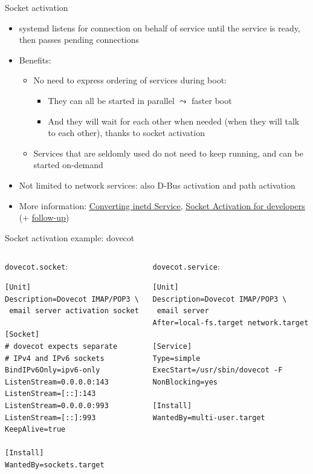 \documentclass[11pt,final,usepdftitle=false]{beamer}
\begin{document}
\begin{frame}{Socket activation}
\begin{itemize}
\item systemd listens for connection on behalf of service until the service is ready, then passes pending connections
\hbr
\item Benefits:
	\begin{itemize}
		\item \alert{No need to express ordering of services during boot}:
			\begin{itemize}
				\item They can all be started in parallel $\leadsto$ \alert{faster boot}
				\item And they will wait for each other when needed (when they will talk to each other), thanks to socket activation
			\end{itemize}
			\hbr
		\item Services that are \alert{seldomly used do not need to keep running}, and can be started on-demand
\end{itemize}
\hbr
\item Not limited to network services: also D-Bus activation and path activation
\hbr
\item More information: \href{http://0pointer.net/blog/projects/inetd.html}{\ul{Converting inetd Service}}, \href{http://0pointer.net/blog/projects/socket-activation.html}{\ul{Socket Activation for developers}} (+ \href{http://0pointer.net/blog/projects/socket-activation2.html}{\ul{follow-up}})
\end{itemize}
\end{frame}

\begin{frame}[fragile]{Socket activation example: dovecot}
\begin{columns}[t]
\begin{column}{0.41\textwidth}
	\alert{\texttt{dovecot.socket}:}
\begin{lstlisting}[basicstyle=\ttfamily\scriptsize,escapeinside={||}]
[Unit]
Description=Dovecot IMAP/POP3 \
 email server activation socket

[Socket]
# dovecot expects separate
# IPv4 and IPv6 sockets
BindIPv6Only=ipv6-only
ListenStream=0.0.0.0:143
ListenStream=[::]:143
ListenStream=0.0.0.0:993
ListenStream=[::]:993
KeepAlive=true

[Install]
WantedBy=sockets.target
\end{lstlisting}
\end{column}
\begin{column}{0.49\textwidth}
\alert{\texttt{dovecot.service}:}
\begin{lstlisting}[basicstyle=\ttfamily\scriptsize,escapeinside={||}]
[Unit]
Description=Dovecot IMAP/POP3 \
 email server
After=local-fs.target network.target

[Service]
Type=simple
ExecStart=/usr/sbin/dovecot -F
NonBlocking=yes

[Install]
WantedBy=multi-user.target
\end{lstlisting}
\end{column}
\end{columns}
\end{frame}
\end{document}
